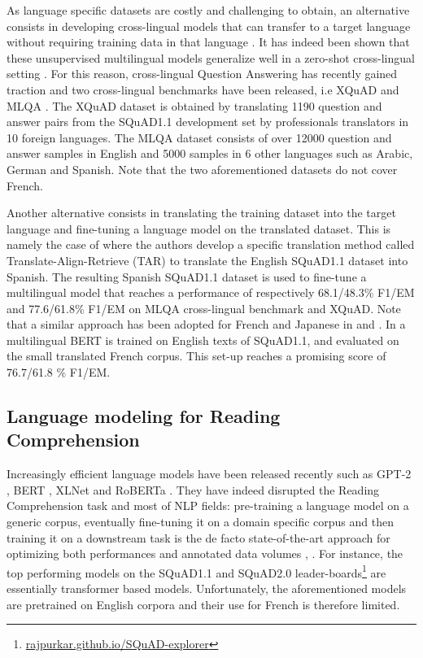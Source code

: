 \documentclass{article}
\begin{document}
As language specific datasets are costly and challenging to obtain, an alternative consists in developing cross-lingual models that can transfer to a target language without requiring training data in that language \citep{mlqa}.
It has indeed been shown that these unsupervised multilingual models generalize well in a zero-shot cross-lingual setting \citep{xquad}.
For this reason, cross-lingual Question Answering has recently gained traction and two cross-lingual benchmarks have been released, i.e XQuAD \citep{xquad} and MLQA \citep{mlqa}.
The XQuAD dataset \citep{xquad} is obtained by translating 1190 question and answer pairs from the SQuAD1.1 development set by professionals translators in 10 foreign languages. 
The MLQA dataset \citep{mlqa} consists of over 12000 question and answer samples in English and 5000 samples in 6 other languages such as Arabic, German and Spanish. 
Note that the two aforementioned datasets do not cover French.

Another alternative consists in translating the training dataset into the target language and fine-tuning a language model on the translated dataset.
This is namely the case of \citep{spanishsquad} where the authors develop a specific translation method called Translate-Align-Retrieve (TAR) to translate the English SQuAD1.1 dataset into Spanish.
The resulting Spanish SQuAD1.1 dataset is used to fine-tune a multilingual model that reaches a performance of respectively 68.1/48.3\% F1/EM and 77.6/61.8\% F1/EM on MLQA cross-lingual benchmark \citep{mlqa} and XQuAD\citep{xquad}.
Note that a similar approach has been adopted for French and Japanese in \citep{french-translated-squad} and \citep{mBERT-qa-french}.
In \citep{mBERT-qa-french} a multilingual BERT is trained on English texts of SQuAD1.1, and evaluated on the small translated \citeauthor{french-translated-squad} French corpus. 
This set-up reaches a promising score of 76.7/61.8 \% F1/EM.

\subsection{Language modeling for Reading Comprehension}

Increasingly efficient language models have been released recently such as GPT-2 \citep{gpt2}, BERT \citep{bert}, XLNet \citep{xlnet} and RoBERTa \citep{roberta}.
They have indeed disrupted the Reading Comprehension task and most of NLP fields: pre-training a language model on a generic corpus, eventually fine-tuning it on a domain specific corpus and then training it on a downstream task is the de facto state-of-the-art approach for optimizing both performances and annotated data volumes \citep{bert}, \citep{roberta}.
For instance, the top performing models on the SQuAD1.1 and SQuAD2.0 leader-boards\footnote{\url{rajpurkar.github.io/SQuAD-explorer}} are essentially transformer based models. 
Unfortunately, the aforementioned models are pretrained on English corpora and their use for French is therefore limited.
\end{document}
